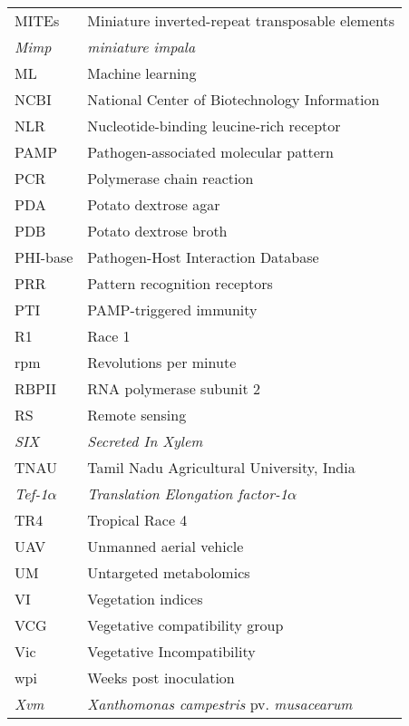 \begin{longtable}{ll}
MITEs    & Miniature   inverted-repeat transposable elements         \\
\textit{Mimp}     & \textit{miniature impala}                                          \\
ML       & Machine learning                                          \\
NCBI     & National Center of   Biotechnology Information            \\
NLR      & Nucleotide-binding leucine-rich receptor                  \\
PAMP     & Pathogen-associated   molecular pattern                   \\
PCR      & Polymerase chain   reaction                               \\
PDA      & Potato dextrose   agar                                    \\
PDB      & Potato dextrose   broth                                   \\
PHI-base & Pathogen-Host   Interaction Database                      \\
PRR      & Pattern recognition   receptors                           \\
PTI      & PAMP-triggered   immunity                                 \\
R1       & Race 1                                                    \\
rpm      & Revolutions per   minute                                  \\
RBPII    & RNA polymerase   subunit 2                                \\
RS       & Remote sensing                                            \\
\textit{SIX}      & \textit{Secreted In Xylem  }                                       \\
TNAU     & Tamil Nadu Agricultural University, India                 \\
\textit{Tef-1}\(\alpha\)      & \textit{Translation   Elongation factor-1}\(\alpha\)                      \\
TR4      & Tropical Race 4                                           \\
UAV      & Unmanned aerial   vehicle                                 \\
UM       & Untargeted   metabolomics                                 \\
VI       & Vegetation indices                                        \\
VCG      & Vegetative   compatibility group                          \\
Vic      & Vegetative   Incompatibility                              \\
wpi      & Weeks post   inoculation                                  \\
\textit{Xvm}      & \textit{Xanthomonas   campestris }pv. \textit{musacearum}                  
\end{longtable}